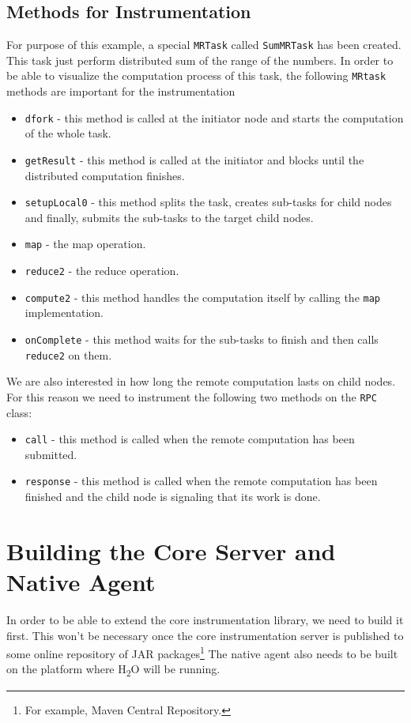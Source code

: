 \subsection{Methods for Instrumentation}
For purpose of this example, a special \texttt{MRTask} called \texttt{SumMRTask} has been created. This task just perform distributed sum of the range of the numbers. In order to be able to visualize the computation process of this task, the following \texttt{MRtask} methods are important for the instrumentation
\begin{itemize}
	\item \texttt{dfork} - this method is called at the initiator node and starts the computation of the whole task.
	\item \texttt{getResult} - this method is called at the initiator and blocks until the distributed computation finishes.
	\item \texttt{setupLocal0} - this method splits the task, creates sub-tasks for child nodes and finally, submits the sub-tasks to the target child nodes.
	\item \texttt{map} - the map operation.
	\item \texttt{reduce2} - the reduce operation.
	\item \texttt{compute2} - this method handles the computation itself by calling the \texttt{map} implementation.
	\item \texttt{onComplete} - this method waits for the sub-tasks to finish and then calls \texttt{reduce2} on them.
\end{itemize}

We are also interested in how long the remote computation lasts on child nodes. For this reason we need to instrument the following two methods on the \texttt{RPC} class:
\begin{itemize}
	\item \texttt{call} - this method is called when the remote computation has been submitted.
	\item \texttt{response} - this method is called when the remote computation has been finished and the child node is signaling that its work is done.
\end{itemize}

\section{Building the Core Server and Native Agent}
In order to be able to extend the core instrumentation library, we need to build it first. This won't be necessary once the core instrumentation server is published to some online repository of JAR packages\footnote{For example, Maven Central Repository.} The native agent also needs to be built on the platform where H\textsubscript{2}O will be running. 

